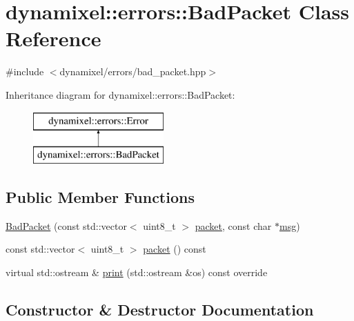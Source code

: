 \hypertarget{classdynamixel_1_1errors_1_1_bad_packet}{}\section{dynamixel\+:\+:errors\+:\+:Bad\+Packet Class Reference}
\label{classdynamixel_1_1errors_1_1_bad_packet}


{\ttfamily \#include $<$dynamixel/errors/bad\+\_\+packet.\+hpp$>$}

Inheritance diagram for dynamixel\+:\+:errors\+:\+:Bad\+Packet\+:\begin{figure}[H]
\begin{center}
\leavevmode
\includegraphics[height=2.000000cm]{classdynamixel_1_1errors_1_1_bad_packet}
\end{center}
\end{figure}
\subsection*{Public Member Functions}
\begin{DoxyCompactItemize}
\item 
\hyperlink{classdynamixel_1_1errors_1_1_bad_packet_a385334ee5fc394f31a81136372e98a60}{Bad\+Packet} (const std\+::vector$<$ uint8\+\_\+t $>$ \hyperlink{classdynamixel_1_1errors_1_1_bad_packet_aaf00423aacd71b96254eb2c4a724400c}{packet}, const char $\ast$\hyperlink{classdynamixel_1_1errors_1_1_error_a4c0804f137545e62204c49fca4c30dcb}{msg})
\item 
const std\+::vector$<$ uint8\+\_\+t $>$ \hyperlink{classdynamixel_1_1errors_1_1_bad_packet_aaf00423aacd71b96254eb2c4a724400c}{packet} () const 
\item 
virtual std\+::ostream \& \hyperlink{classdynamixel_1_1errors_1_1_bad_packet_af0b78897b3dc6d5455a0581ad587771a}{print} (std\+::ostream \&os) const override
\end{DoxyCompactItemize}


\subsection{Constructor \& Destructor Documentation}
